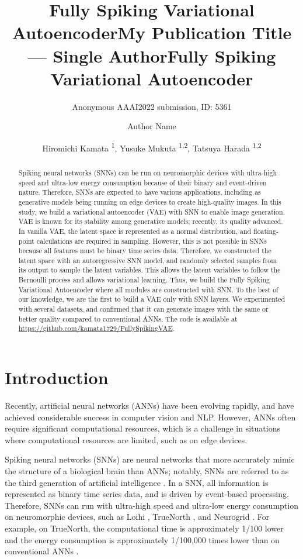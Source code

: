 \documentclass[letterpaper]{article} %
\title{Fully Spiking Variational Autoencoder}
\author{
    Anonymous AAAI2022 submission, ID: 5361
}
\title{My Publication Title --- Single Author}
\author {
    Author Name
}
\title{Fully Spiking Variational Autoencoder}
\author {
    Hiromichi Kamata \textsuperscript{\rm 1},
    Yusuke Mukuta \textsuperscript{\rm 1,2},
    Tatsuya Harada \textsuperscript{\rm 1,2}
}
\begin{document}
\maketitle

\begin{abstract}
Spiking neural networks (SNNs) can be run on neuromorphic devices with ultra-high speed and ultra-low energy consumption because of their binary and event-driven nature. Therefore, SNNs are expected to have various applications, including as generative models being running on edge devices to create high-quality images. In this study, we build a variational autoencoder (VAE) with SNN to enable image generation. VAE is known for its stability among generative models; recently, its quality advanced. In vanilla VAE, the latent space is represented as a normal distribution, and floating-point calculations are required in sampling. However, this is not possible in SNNs because all features must be binary time series data. Therefore, we constructed the latent space with an autoregressive SNN model, and randomly selected samples from its output to sample the latent variables. This allows the latent variables to follow the Bernoulli process and allows variational learning. Thus, we build the Fully Spiking Variational Autoencoder where all modules are constructed with SNN. To the best of our knowledge, we are the first to build a VAE only with SNN layers. We experimented with several datasets, and confirmed that it can generate images with the same or better quality compared to conventional ANNs. The code is available at \url{https://github.com/kamata1729/FullySpikingVAE}.
\end{abstract}




\bigskip
\section{Introduction}
Recently, artificial neural networks (ANNs) have been evolving rapidly, and have achieved considerable success in computer vision and NLP. However, ANNs often require significant computational resources, which is a challenge in situations where computational resources are limited, such as on edge devices.

Spiking neural networks (SNNs) are neural networks that more accurately mimic the structure of a biological brain than ANNs; notably, SNNs are referred to as the third generation of artificial intelligence \cite{thirdgen}. In a SNN, all information is represented as binary time series data, and is driven by event-based processing. Therefore, SNNs can run with ultra-high speed and ultra-low energy consumption on neuromorphic devices, such as Loihi \cite{loihi}, TrueNorth \cite{truenorth}, and Neurogrid \cite{neurogrid}. For example, on TrueNorth, the computational time is approximately 1/100 lower and the energy consumption is approximately 1/100,000 times lower than on conventional ANNs \cite{Cassidy2014RealTimeSC}.
\end{document}
